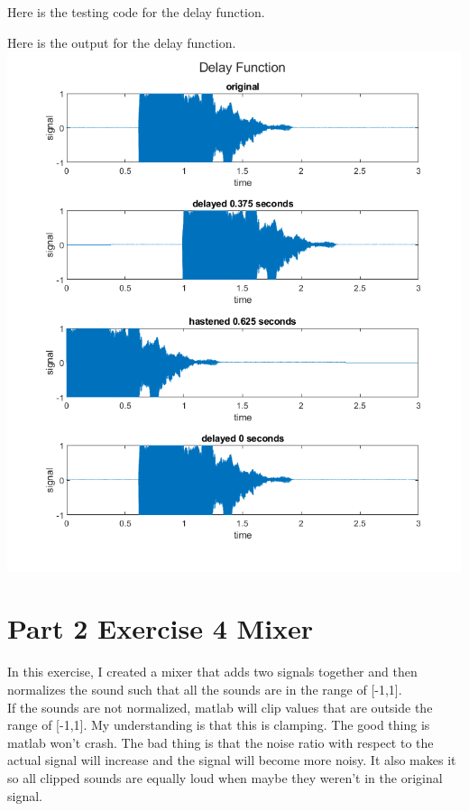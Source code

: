 \documentclass[11pt]{article}
\begin{document}
Here is the testing code for the delay function.\\



\vspace{10pt}

Here is the output for the delay function.\\

\includegraphics[width=\textwidth]{delay.png}

\section{Part 2 Exercise 4 Mixer}

In this exercise, I created a mixer that adds two signals together and then normalizes the sound such that all the sounds are in the range of [-1,1].\\

If the sounds are not normalized, matlab will clip values that are outside the range of [-1,1]. My understanding is that this is clamping. The good thing is matlab won't crash. The bad thing is that the noise ratio with respect to the actual signal will increase and the signal will become more noisy. It also makes it so all clipped sounds are equally loud when maybe they weren't in the original signal.\\
\end{document}
